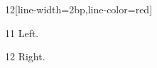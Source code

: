 \documentclass[paper=A4]{ropas-poster}
\begin{document}
\begin{postergrid}{1}{2}[line-width=2bp,line-color=red]
\begin{posterblock}{1}{1}
Left.
\end{posterblock}
\begin{posterblock}{1}{2}
Right.
\end{posterblock}
\end{postergrid}
\end{document}
